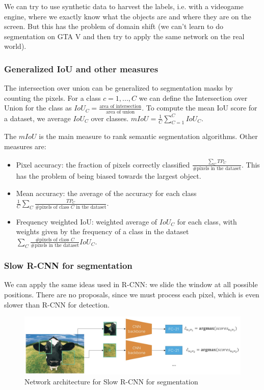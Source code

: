 We can try to use synthetic data to harvest the labels, i.e. with a videogame engine, where we exactly know what the objects are and where they are on the screen.
But this has the problem of domain shift (we can't learn to do segmentation on GTA V and then try to apply the same network on the real world).

\subsubsection{Generalized IoU and other measures}
The intersection over union can be generalized to segmentation masks by counting the pixels.
For a class $c = 1, ..., C$ we can define the Intersection over Union for the class as $IoU_C = \frac{\text{area of intersection}}{\text{area of union}}$.
To compute the mean IoU score for a dataset, we average $IoU_C$ over classes.
$mIoU = \frac{1}{C} \sum_{C=1}^{C} IoU_C$.

The $mIoU$ is the main measure to rank semantic segmentation algorithms.
Other measures are:
\begin{itemize}
  \item Pixel accuracy: the fraction of pixels correctly classified $\frac{\sum_{C} TP_C}{\text{\# pixels in the dataset}}$. This has the problem of being biased towards the largest object.
  \item Mean accuracy: the average of the accuracy for each class $\frac{1}{C} \sum_{C} \frac{TP_C}{\text{\# pixels of class }C \text{ in the dataset}}$.
  \item Frequency weighted IoU: weighted average of $IoU_C$ for each class, with weights given by the frequency of a class in the dataset $\sum_{C} \frac{\text{\# pixels of class }C}{\text{\# pixels in the dataset}} IoU_C$.
\end{itemize}

\subsubsection{Slow R-CNN for segmentation}
We can apply the same ideas used in R-CNN: we slide the window at all possible positions.
There are no proposals, since we must process each pixel, which is even slower than R-CNN for detection.

\begin{figure}[htbp]
  \centering
  \includegraphics[width=0.8\linewidth]{./img/slow_rcnn_segmentation.jpg}
  \caption{Network architecture for Slow R-CNN for segmentation}
\end{figure}

